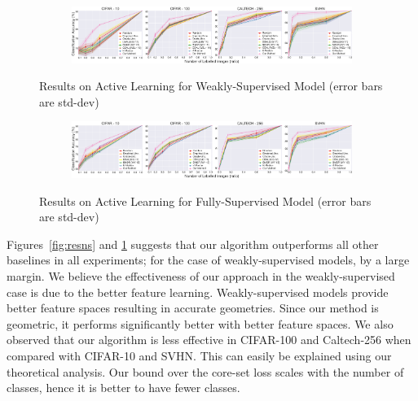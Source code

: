 \documentclass{article} %
\begin{document}
\begin{figure}[tb]
    \centering
    \begin{subfigure}[b]{\textwidth}
        \includegraphics[width=\textwidth]{fig_ws5.pdf}
    \end{subfigure}
    \vspace{-5mm}
    \caption{Results on Active Learning for Weakly-Supervised Model (error bars are std-dev)}\label{fig:ressemi}
        \vspace{-3mm}
    \label{fig:resns}
   \vspace{5mm}
    \begin{subfigure}[b]{\textwidth}
        \includegraphics[width=\textwidth]{fs_fig5.pdf}
    \end{subfigure}
        \vspace{-5mm}
    \caption{Results on Active Learning for Fully-Supervised Model (error bars are std-dev)}\label{fig:resnosemi}
        \vspace{-5mm}
    \label{fig:ress}
\end{figure}

Figures~\ref{fig:resns} and \ref{fig:ress} suggests that our algorithm outperforms all other baselines in all
experiments; for the case of weakly-supervised models, by a large margin. We believe the effectiveness of our approach
in the weakly-supervised case is due to the better feature learning. Weakly-supervised models provide better feature
spaces resulting in accurate geometries. Since our method is geometric, it performs significantly better with better
feature spaces. We also observed that our algorithm is less effective in CIFAR-100 and Caltech-256 when compared with
CIFAR-10 and SVHN. This can easily be explained using our theoretical analysis. Our bound over the core-set loss scales with the
number of classes, hence it is better to have fewer classes.
\end{document}
